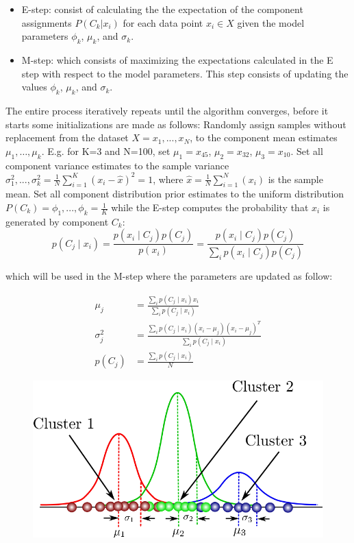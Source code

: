 \begin{itemize}
	\item	 E-step: consist of calculating the the expectation of the component assignments $P(C_k | x_i)$ for each data point $x_i \in X$ given the model parameters $\phi_k$,  $\mu_k$, and $\sigma_k$.
\end{itemize}
\begin{itemize}
	\item	M-step: which consists of maximizing the expectations calculated in the E step with respect to the model parameters. This step consists of updating the values $\phi_k$,  $\mu_k$, and $\sigma_k$.
\end{itemize}
The entire process iteratively repeats until the algorithm converges, before it starts some initializations are made as follows:
Randomly assign samples without replacement from the dataset $X={x_1, ..., x_N}$, to the component mean estimates $\mu_1, … , \mu_k$. E.g. for K=3 and N=100, set $\mu_1= x_45$, $\mu_2 = x_32$, $\mu_3 = x_10$. 
Set all component variance estimates to the sample variance 
$\sigma_1^2,...,\sigma_k^2=\frac{1}{N}\sum_{i=1}^{K} (x_i -\hat{x})^{2}=1$, where $\hat{x}=\frac{1}{N}\sum_{i=1}^{N}(x_i)$ is the sample mean.
Set all component distribution prior estimates to the uniform distribution  
$P(C_k) = \phi_1,..., \phi_k  = \frac{1}{K}$
while the E-step computes the probability that $x_i$ is generated by component $C_k$:
\begin{equation}
p(C_j \mid x_i ) = \frac{ p(x_i \mid C_j)p(C_j) }{p(x_i)} = \frac{p(x_i \mid C_j)p(C_j)}{\sum_ip(x_i \mid C_j)p(C_j)}
\label{eq:}	
\end{equation}

which will be used in the M-step where the parameters are updated as follow:	

\begin{align}
\mu_j&=\frac{ \sum_{i} p(C_j \mid x_i )x_i}{\sum_{i} {p(C_j \mid x_i )}} \\
\sigma_j^2 &=\frac{\sum_{i}{p ( C_j \mid x_i)}  (x_i - \mu_j) (x_i - \mu_j)^T} {\sum_{i} {p(C_j \mid x_i )}} \\
p ( C_j ) &= \frac{ \sum_{i} p(C_j \mid x_i )}{N}
\end{align}

\begin{figure}
	\centering
	\includegraphics[scale=0.3]{Figures/GMM}
	\caption{}
	\label{fig:GMM}
\end{figure}

